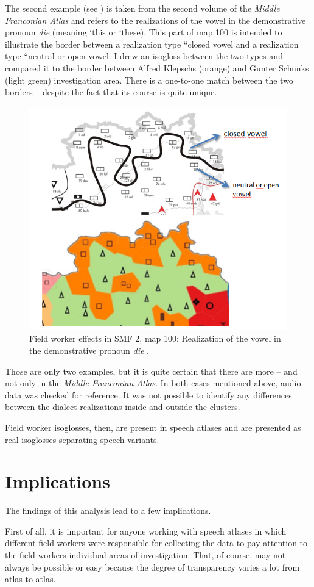 \documentclass[output=paper]{LSP/langsci}
\begin{document}
The second example (see ) is taken from the second volume of the \textit{Middle Franconian Atlas} and refers to the realizations of the vowel in the demonstrative pronoun \textit{die} (meaning `this{\textquotesingle} or `these{\textquotesingle}). This part of map 100 is intended to illustrate the border between a realization type ``closed vowel{\textquotedbl} and a realization type ``neutral or open vowel{\textquotedbl}. I drew an isogloss between the two types and compared it to the border between Alfred Klepsch{\textquotesingle}s (orange) and Gunter Schunk{\textquotesingle}s (light green) investigation area. There is a one-to-one match between the two borders – despite the fact that its course is quite unique.

\begin{figure}
\includegraphics[width=.4\textwidth]{illustrations/mathus_fig12}
\caption{Field worker effects in SMF 2, map 100: Realization of the vowel in the demonstrative pronoun \textit{die} \citep[241]{mathussek_sprachraume_2014}.}
\label{fig:12}
\end{figure}

Those are only two examples, but it is quite certain that there are more – and not only in the \textit{Middle Franconian Atlas}. In both cases mentioned above, audio data was checked for reference. It was not possible to identify any differences between the dialect realizations inside and outside the clusters.

Field worker isoglosses, then, are present in speech atlases and are presented as real isoglosses separating speech variants.

\section{Implications}
The findings of this analysis lead to a few implications.

First of all, it is important for anyone working with speech atlases in which different field workers were responsible for collecting the data to pay attention to the field workers{\textquotesingle} individual areas of investigation. That, of course, may not always be possible or easy because the degree of transparency varies a lot from atlas to atlas.
\end{document}
